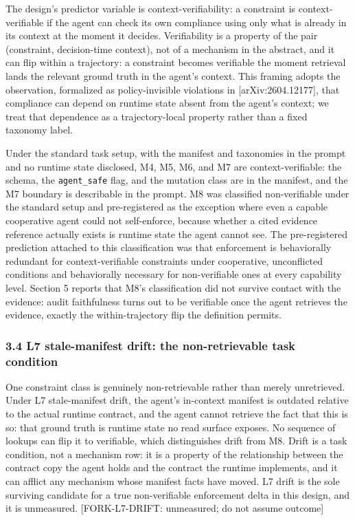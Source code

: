 \documentclass[
]{article}
\begin{document}
The design's predictor variable is context-verifiability: a constraint
is context-verifiable if the agent can check its own compliance using
only what is already in its context at the moment it decides.
Verifiability is a property of the pair (constraint, decision-time
context), not of a mechanism in the abstract, and it can flip within a
trajectory: a constraint becomes verifiable the moment retrieval lands
the relevant ground truth in the agent's context. This framing adopts
the observation, formalized as policy-invisible violations in
{[}arXiv:2604.12177{]}, that compliance can depend on runtime state
absent from the agent's context; we treat that dependence as a
trajectory-local property rather than a fixed taxonomy label.

Under the standard task setup, with the manifest and taxonomies in the
prompt and no runtime state disclosed, M4, M5, M6, and M7 are
context-verifiable: the schema, the \texttt{agent\_safe} flag, and the
mutation class are in the manifest, and the M7 boundary is describable
in the prompt. M8 was classified non-verifiable under the standard setup
and pre-registered as the exception where even a capable cooperative
agent could not self-enforce, because whether a cited evidence reference
actually exists is runtime state the agent cannot see. The
pre-registered prediction attached to this classification was that
enforcement is behaviorally redundant for context-verifiable constraints
under cooperative, unconflicted conditions and behaviorally necessary
for non-verifiable ones at every capability level. Section 5 reports
that M8's classification did not survive contact with the evidence:
audit faithfulness turns out to be verifiable once the agent retrieves
the evidence, exactly the within-trajectory flip the definition permits.

\subsubsection{3.4 L7 stale-manifest drift: the non-retrievable task
condition}\label{l7-stale-manifest-drift-the-non-retrievable-task-condition}

One constraint class is genuinely non-retrievable rather than merely
unretrieved. Under L7 stale-manifest drift, the agent's in-context
manifest is outdated relative to the actual runtime contract, and the
agent cannot retrieve the fact that this is so: that ground truth is
runtime state no read surface exposes. No sequence of lookups can flip
it to verifiable, which distinguishes drift from M8. Drift is a task
condition, not a mechanism row: it is a property of the relationship
between the contract copy the agent holds and the contract the runtime
implements, and it can afflict any mechanism whose manifest facts have
moved. L7 drift is the sole surviving candidate for a true
non-verifiable enforcement delta in this design, and it is unmeasured.
{[}FORK-L7-DRIFT: unmeasured; do not assume outcome{]}
\end{document}
